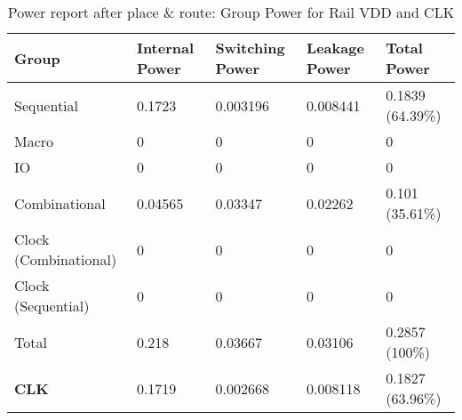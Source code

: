 \begin{table}[h]
	\centering
\begin{tabular}{|l|l|l|l|l|}
	\hline
\textbf{Group}                &           \textbf{Internal  Power} &  \textbf{Switching  Power}  &   \textbf{Leakage  Power}     & \textbf{Total  Power} \\
\hline
Sequential       &                 0.1723  &  0.003196  &  0.008441  &    0.1839 (64.39\%)  \\
Macro                       &           0    &       0       &    0      &     0  \\
IO                         &            0       &    0     &      0      &     0 \\
Combinational                &    0.04565   &  0.03347   &  0.02262   &   0.101 (35.61\%)   \\
Clock (Combinational)        &          0      &     0     &      0    &       0  \\
Clock (Sequential)             &        0     &      0      &     0     &      0 \\
\hline
Total                      &       0.218  &   0.03667   &  0.03106  &    0.2857 (100\%)  \\\hline
\hline
\textbf{CLK}                         &    0.1719   & 0.002668  & 0.008118    &  0.1827 (63.96\%)  \\\hline
\end{tabular}
\caption{Power report after place \& route: Group Power for Rail VDD and CLK}
\label{fig:innpwrvdd}
\end{table}